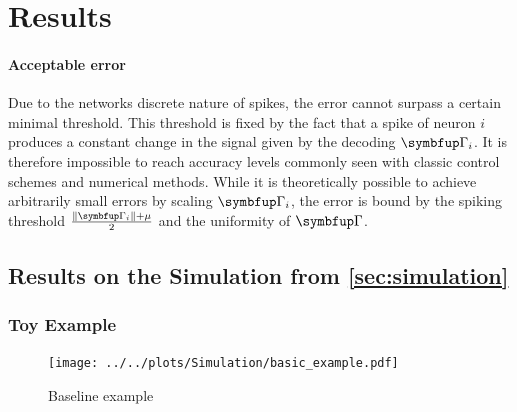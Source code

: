 \chapter{Results}
\subsubsection{Acceptable error}
Due to the networks discrete nature of spikes, the error cannot surpass a certain minimal threshold. This threshold is fixed by the fact that a spike of neuron $i$ produces a constant change in the signal given by the decoding $\bmu{\Gamma}_i$. It is therefore impossible to reach accuracy levels commonly seen with classic control schemes and numerical methods. While it is theoretically possible to achieve arbitrarily small errors by scaling $\bmu{\Gamma}_i$, the error is bound by the spiking threshold  $\frac{\|\bmu{\Gamma}_i\| + \mu}{2}$ and the uniformity of $\bmu{\Gamma}$.\\

\section{Results on the Simulation from \cref{sec:simulation}}\label{sec:res_simulation}
\subsection{Toy Example}
\begin{figure}[h!]
	\centering
	\centering
	\texttt{[image: ../../plots/Simulation/basic\_example.pdf]}
	\caption{Baseline example}
	\label{fig:sim_res_1}
\end{figure}

